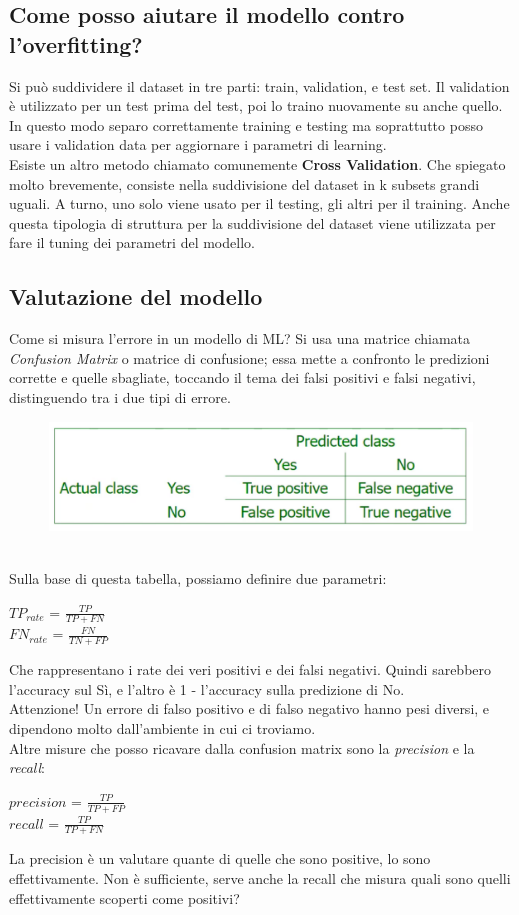 \subsection{Come posso aiutare il modello contro l'overfitting?}
Si può suddividere il dataset in tre parti: train, validation, e test set. Il validation è utilizzato per un test prima del test, poi lo traino nuovamente su anche quello. In questo modo separo correttamente training e testing ma soprattutto posso usare i validation data per aggiornare i parametri di learning. 
\\
Esiste un altro metodo chiamato comunemente \textbf{Cross Validation}. Che spiegato molto brevemente, consiste nella suddivisione del dataset in k subsets grandi uguali. A turno, uno solo viene usato per il testing, gli altri per il training. Anche questa tipologia di struttura per la suddivisione del dataset viene utilizzata per fare il tuning dei parametri del modello.

\subsection{Valutazione del modello}
Come si misura l'errore in un modello di ML? Si usa una matrice chiamata \textit{Confusion Matrix} o matrice di confusione; essa mette a confronto le predizioni corrette e quelle sbagliate, toccando il tema dei falsi positivi e falsi negativi, distinguendo tra i due tipi di errore. 
\\
\begin{figure}[th]
    \centering
    \includegraphics[scale=0.5]{ML/img/conf_matrix.png}
\end{figure}
\\
Sulla base di questa tabella, possiamo definire due parametri:
\begin{center}
    $TP_{rate}$ = $\frac{TP}{TP + FN}$
    \\[2ex]
    $FN_{rate}$ = $\frac{FN}{TN + FP}$
\end{center}
Che rappresentano i rate dei veri positivi e dei falsi negativi. Quindi sarebbero l'accuracy sul Sì, e l'altro è 1 - l'accuracy sulla predizione di No.
\\
Attenzione! Un errore di falso positivo e di falso negativo hanno pesi diversi, e dipendono molto dall'ambiente in cui ci troviamo. 
\\ 
Altre misure che posso ricavare dalla confusion matrix sono la \textit{precision} e la \textit{recall}:
\begin{center}
    $precision$ = $\frac{TP}{TP + FP}$
    \\[2ex]
    $recall$ = $\frac{TP}{TP + FN}$
\end{center}
La precision è un valutare quante di quelle che sono positive, lo sono effettivamente. Non è sufficiente, serve anche la recall che misura quali sono quelli effettivamente scoperti come positivi?

